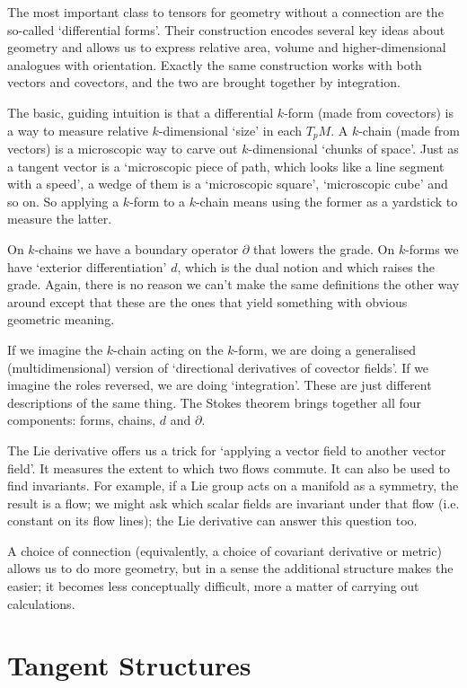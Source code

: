 \documentclass[oneside,english]{amsbook}
\numberwithin{section}{chapter}
\theoremstyle{plain}
\theoremstyle{definition}
\begin{document}
The most important class to tensors for geometry without a connection are the so-called `differential forms'. Their construction encodes several key ideas about geometry and allows us to express relative area, volume and higher-dimensional analogues with orientation. Exactly the same construction works with both vectors and covectors, and the two are brought together by integration. 

The basic, guiding intuition is that a differential $k$-form (made from covectors) is a way to measure relative $k$-dimensional `size' in each $T_p M$. A $k$-chain (made from vectors) is a microscopic way to carve out $k$-dimensional `chunks of space'. Just as a tangent vector is a `microscopic piece of path, which looks like a line segment with a speed', a wedge of them is a `microscopic square', `microscopic cube' and so on. So applying a $k$-form to a $k$-chain means using the former as a yardstick to measure the latter.

On $k$-chains we have a boundary operator $\partial$ that lowers the grade. On $k$-forms we have `exterior differentiation' $d$, which is the dual notion and which raises the grade. Again, there is no reason we can't make the same definitions the other way around except that these are the ones that yield something with obvious geometric meaning.

If we imagine the $k$-chain acting on the $k$-form, we are doing a generalised (multidimensional) version of `directional derivatives of covector fields'. If we imagine the roles reversed, we are doing `integration'. These are just different descriptions of the same thing. The Stokes theorem brings together all four components: forms, chains, $d$ and $\partial$. 

The Lie derivative offers us a trick for `applying a vector field to another vector field'. It measures the extent to which two flows commute. It can also be used to find invariants. For example, if a Lie group acts on a manifold as a symmetry, the result is a flow; we might ask which scalar fields are invariant under that flow (i.e. constant on its flow lines); the Lie derivative can answer this question too.

A choice of connection (equivalently, a choice of covariant derivative or metric) allows us to do more geometry, but in a sense the additional structure makes the easier; it becomes less conceptually difficult, more a matter of carrying out calculations.


\section{Tangent Structures}
\end{document}
